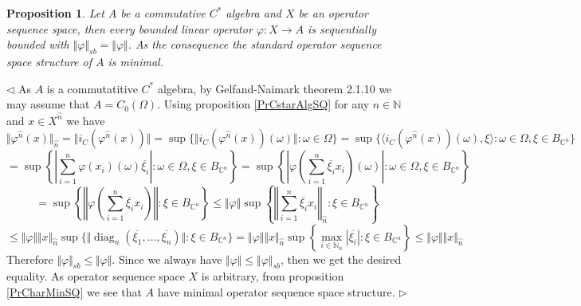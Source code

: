 \documentclass[12pt]{article}
\newtheorem{proposition}[theorem]{Proposition}
\newenvironment{proof}{\par $\triangleleft$}{$\triangleright$}
\begin{document}
\begin{proposition}\label{PrCommCstarAlgIsMin} Let $A$ be a commutative $C^*$ algebra and $X$ be an operator sequence space, then every bounded linear operator $\varphi:X\to A$ is sequentially bounded with $\Vert\varphi\Vert_{sb}=\Vert\varphi\Vert$. As the consequence the standard operator sequence space structure of $A$ is minimal.
\end{proposition}
\begin{proof} As $A$ is a commutatitive $C^*$ algebra, by Gelfand-Naimark theorem 2.1.10 \cite{MurphCstarOpTh} we may assume that $A=C_0(\Omega)$. Using proposition \ref{PrCstarAlgSQ} for any $n\in\mathbb{N}$ and $x\in X^{\wideparen{n}}$ we have 
$$
\Vert\varphi^{\wideparen{n}}(x)\Vert_{\wideparen{n}}
=\Vert i_C(\varphi^{\wideparen{n}}(x))\Vert
=\sup\{\Vert i_C(\varphi^{\wideparen{n}}(x))(\omega)\Vert:\omega\in\Omega\}
=\sup\{\langle i_C(\varphi^{\wideparen{n}}(x))(\omega),\xi\rangle:\omega\in\Omega,\xi\in B_{\mathbb{C}^n}\}
$$
$$
=\sup\left\{\left|\sum_{i=1}^n \varphi(x_i)(\omega)\overline{\xi_i}\right|:\omega\in\Omega,\xi\in B_{\mathbb{C}^n}\right\}
=\sup\left\{\left| \varphi\left(\sum_{i=1}^n \overline{\xi_i} x_i\right)(\omega)\right|:\omega\in\Omega,\xi\in B_{\mathbb{C}^n}\right\}
$$
$$
=\sup\left\{\left\Vert \varphi\left(\sum_{i=1}^n \overline{\xi_i} x_i\right)\right\Vert:\xi\in B_{\mathbb{C}^n}\right\}
\leq\Vert\varphi\Vert\sup\left\{\left\Vert \sum_{i=1}^n \overline{\xi_i} x_i\right\Vert_{\wideparen{n}}:\xi\in B_{\mathbb{C}^n}\right\}
$$
$$
\leq\Vert\varphi\Vert\Vert x\Vert_{\wideparen{n}}\sup\{\Vert\operatorname{diag}_n(\overline{\xi_1},\ldots,\overline{\xi_n})\Vert:\xi\in B_{\mathbb{C}^n}\}
=\Vert\varphi\Vert\Vert x\Vert_{\wideparen{n}}\sup\left\{\max_{i\in\mathbb{N}_n}|\overline{\xi_i}|:\xi\in B_{\mathbb{C}^n}\right\}
\leq\Vert\varphi\Vert\Vert x\Vert_{\wideparen{n}}
$$
Therefore $\Vert\varphi\Vert_{sb}\leq\Vert\varphi\Vert$. Since we always have $\Vert\varphi\Vert\leq\Vert\varphi\Vert_{sb}$, then we get the desired equality. As operator sequence space $X$ is arbitrary, from proposition \ref{PrCharMinSQ} we see that $A$ have minimal operator sequence space structure.
\end{proof}
\end{document}
